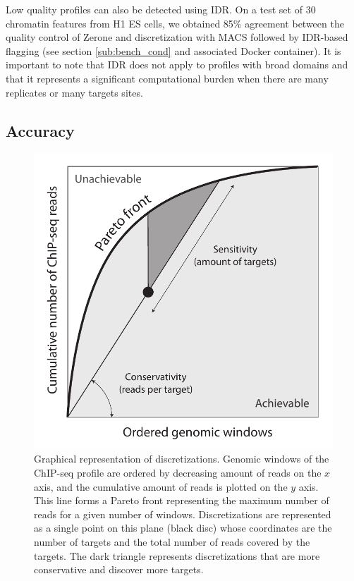 \documentclass{bioinfo}
\begin{document}
Low quality profiles can also be detected using IDR. On a test
set of 30 chromatin features from H1 ES cells, we obtained 85\%
agreement between the quality control of Zerone and discretization
with MACS followed by IDR-based flagging (see section
\ref{sub:bench_cond} and associated Docker
container). It is important to note that IDR does not apply to
profiles with broad domains and that it represents a significant
computational burden when there are many replicates or many targets
sites.

\subsection{Accuracy}

\begin{figure}[!tpb]
\centerline{\includegraphics[scale=0.5]{pareto_front_explanation.pdf}}
\caption{
  Graphical representation of discretizations. Genomic
  windows of the ChIP-seq profile are ordered by decreasing amount of
  reads on the $x$ axis, and the cumulative amount of reads is plotted
  on the $y$ axis. This line forms a Pareto front representing the
  maximum number of reads for a given number of windows. Discretizations
  are represented as a single point on this plane (black disc) whose
  coordinates are the number of targets and the total number of reads
  covered by the targets. The dark triangle represents discretizations
  that are more conservative and discover more targets.
}
\label{fig:expl}
\end{figure}
\end{document}
